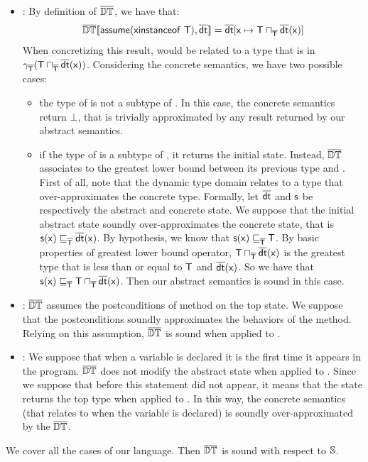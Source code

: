 \documentclass{llncs}
\begin{document}
\begin{lemma}
\begin{itemize}
\item {}: By definition of $\overline{\mathit{\mathbb{DT}}}$, we have that:
\[
\mathbb{\overline{\mathit{\mathbb{DT}}}}\llbracket \mathtt{\mathsf{assume(x instanceof\ T)}, \mathsf{\overline{dt}}} \rrbracket=\mathsf{\overline{dt}}[\mathsf{x} \mapsto \mathsf{T} \sqcap_{\mathsf{\overline{T}}} \mathsf{\overline{dt}}(\mathsf{x})]\]
When concretizing this result,  would be related to a type that is in $\gamma_{\mathsf{\overline{T}}}(\mathsf{T} \sqcap_{\mathsf{\overline{T}}} \mathsf{\overline{dt}}(\mathsf{x}))$. Considering the concrete semantics, we have two possible cases:
\begin{itemize}
\item the type of  is not a subtype of . In this case, the concrete semantics return $\bot$, that is trivially approximated by any result returned by our abstract semantics.
\item if the type of  is a subtype of , it returns the initial state. Instead, $\overline{\mathit{\mathbb{DT}}}$ associates  to the greatest lower bound between its previous type and . First of all, note that the dynamic type domain relates  to a type that over-approximates the concrete type. Formally, let $\mathsf{\overline{dt}}$ and $\mathsf{s}$ be respectively the abstract and concrete state. We suppose that the initial abstract state soundly over-approximates the concrete state, that is $\mathsf{s}(\mathsf{x}) \sqsubseteq_{\mathsf{\overline{T}}} \mathsf{\overline{dt}}(\mathsf{x})$. By hypothesis, we know that $\mathsf{s}(\mathsf{x}) \sqsubseteq_{\mathsf{\overline{T}}} \mathsf{T}$. By basic properties of greatest lower bound operator, $\mathsf{T} \sqcap_{\mathsf{\overline{T}}} \mathsf{\overline{dt}}(\mathsf{x})$ is the greatest type that is less than or equal to $\mathsf{T}$ and $\mathsf{\overline{dt}}(\mathsf{x})$. So we have that $\mathsf{s}(\mathsf{x}) \sqsubseteq_{\mathsf{\overline{T}}} \mathsf{T} \sqcap_{\mathsf{\overline{T}}} \mathsf{\overline{dt}}(\mathsf{x})$. Then our abstract semantics is sound in this case.
\end{itemize}

\item {}: $\overline{\mathit{\mathbb{DT}}}$ assumes the postconditions of method  on the top state. We suppose that the postconditions soundly approximates the behaviors of the method. Relying on this assumption, $\overline{\mathit{\mathbb{DT}}}$ is sound when applied to .
\item {}: We suppose that when a variable is declared it is the first time it appears in the program. $\overline{\mathit{\mathbb{DT}}}$ does not modify the abstract state when applied to . Since we suppose that before this statement  did not appear, it means that the state returns the top type when applied to . In this way, the concrete semantics (that relates  to  when the variable is declared) is soundly over-approximated by the $\overline{\mathit{\mathbb{DT}}}$.
\end{itemize}
We cover all the cases of our language. Then $\overline{\mathit{\mathbb{DT}}}$ is sound with respect to $\mathit{\mathbb{S}}$.
\end{lemma}
\end{document}
